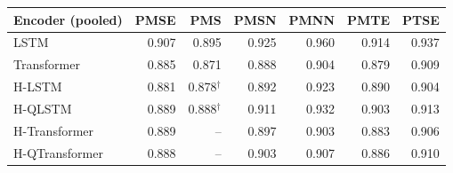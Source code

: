 \begin{tabular}{lrrrrrr}
\toprule
Encoder (pooled) & PMSE & PMS & PMSN & PMNN & PMTE & PTSE \\
\midrule
LSTM & 0.907 & 0.895 & 0.925 & 0.960 & 0.914 & 0.937 \\
Transformer & 0.885 & 0.871 & 0.888 & 0.904 & 0.879 & 0.909 \\
H-LSTM & 0.881 & 0.878$^\dagger$ & 0.892 & 0.923 & 0.890 & 0.904 \\
H-QLSTM & 0.889 & 0.888$^\dagger$ & 0.911 & 0.932 & 0.903 & 0.913 \\
H-Transformer & 0.889 & -- & 0.897 & 0.903 & 0.883 & 0.906 \\
H-QTransformer & 0.888 & -- & 0.903 & 0.907 & 0.886 & 0.910 \\
\bottomrule
\end{tabular}
